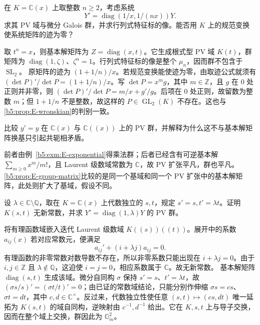 \begin{exercise}
	在 \(K=\mathbb C(x)\) 上取整数 \(n\ge2\)，考虑系统
	\[
		Y'=\operatorname{diag}(1/x,1/(nx))Y.
	\]
	求其 PV 域与微分 Galois 群，并求行列式特征标的像。能否用 \(K\) 上的规范变换使系统矩阵的迹为零？
\end{exercise}
\begin{solution}
	取 \(t^n=x\)，则基本解矩阵为 \(Z=\operatorname{diag}(x,t)\)。它生成根式型 PV 域 \(K(t)\)，群矩阵为 \(\operatorname{diag}(1,\zeta)\)、\(\zeta^n=1\)。行列式特征标的像是整个 \(\mu_n\)，因而群不包含于 \(\operatorname{SL}_2\)。 原矩阵的迹为 \((1+1/n)/x\)。若规范变换能使迹为零，由取迹公式就须有 \((\det P)'/\det P=(1+1/n)/x\)。写 \(\det P=x^m g\)，其中 \(m\in\mathbb Z\)，且 \(g\) 在 \(0\) 处正则并非零，则 \((\det P)'/\det P=m/x+g'/g\)。后项在 \(0\) 处正则，故留数为整数 \(m\)；但 \(1+1/n\) 不是整数，故这样的 \(P\in\operatorname{GL}_2(K)\) 不存在。这也与\cref{b5:prop:E-wronskian}的判别一致。
\end{solution}

\begin{exercise}
	比较 \(y'=y\) 在 \(\mathbb C(x)\) 与 \(\mathbb C(\!(x)\!)\) 上的 PV 群，并解释为什么这不与基本解矩阵换基只引起共轭相矛盾。
\end{exercise}
\begin{solution}
	前者由例~\ref{b5:exm:E-exponential}得乘法群；后者已经含有可逆基本解 \(\sum_{m\ge0}x^m/m!\)，且 Laurent 级数域常数为 \(\mathbb C\)，故 PV 扩张平凡，群也平凡。\cref{b5:prop:E-group-matrix}比较的是同一个基域和同一个 PV 扩张中的基本解矩阵，此处则扩大了基域，假设不同。
\end{solution}

\begin{optionalexercise}
	设 \(\lambda\in\mathbb C\setminus\mathbb Q\)，取在 \(K=\mathbb C(x)\) 上代数独立的 \(s,t\)，规定 \(s'=s,t'=\lambda t\)。证明 \(K(s,t)\) 无新常数，并求 \(Y'=\operatorname{diag}(1,\lambda)Y\) 的 PV 群。
\end{optionalexercise}
\begin{solution}
	将有理函数域嵌入迭代 Laurent 级数域 \(K(\!(s)\!)(\!(t)\!)\)。展开中的系数 \(a_{ij}(x)\) 若对应常数元，便满足
	\[
		a_{ij}'+(i+\lambda j)a_{ij}=0.
	\]
	有理函数的非零常数对数导数不存在，所以非零系数只能出现在 \(i+\lambda j=0\)。由于 \(i,j\in\mathbb Z\) 且 \(\lambda\notin\mathbb Q\)，这迫使 \(i=j=0\)，相应系数属于 \(\mathbb C\)。故无新常数。 基本解矩阵 \(\operatorname{diag}(s,t)\) 生成该域。微分自同构 \(\sigma\) 保持 \(s'=s\)、\(t'=\lambda t\)，故 \((\sigma s/s)'=(\sigma t/t)'=0\)；由已证的常数域结论，只能分别作伸缩 \(\sigma s=cs\)、\(\sigma t=dt\)，其中 \(c,d\in\mathbb C^\times\)。反过来，代数独立性使任意 \((s,t)\mapsto(cs,dt)\) 唯一延拓为 \(K(s,t)\) 的域自同构，逆映射由 \(c^{-1},d^{-1}\) 给出。它在 \(K,s,t\) 上与导子交换，因而在整个域上交换，群因此为 \(\mathbb G_m^2\)。
\end{solution}
